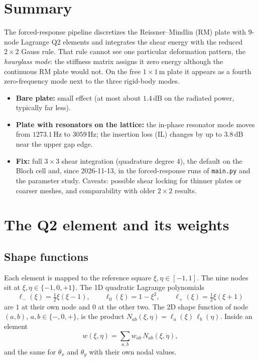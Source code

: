 \section{Summary}

The forced-response pipeline discretizes the Reissner--Mindlin (RM) plate with
9-node Lagrange Q2 elements and integrates the shear energy with the reduced
$2\times 2$ Gauss rule. That rule cannot see one particular deformation pattern,
the \emph{hourglass mode}: the stiffness matrix assigns it zero energy although the
continuous RM plate would not. On the free $1 \times 1\,\mathrm{m}$ plate it appears
as a fourth zero-frequency mode next to the three rigid-body modes.
\begin{itemize}
  \item \textbf{Bare plate:} small effect (at most about $1.4\,\mathrm{dB}$ on the
        radiated power, typically far less).
  \item \textbf{Plate with resonators on the lattice:} the in-phase resonator mode
        moves from $1273.1\,\mathrm{Hz}$ to $3059\,\mathrm{Hz}$; the insertion loss
        (IL) changes by up to $3.8\,\mathrm{dB}$ near the upper gap edge.
  \item \textbf{Fix:} full $3\times 3$ shear integration (quadrature degree 4),
        the default on the Bloch cell and, since 2026-11-13, in the forced-response
        runs of \texttt{main.py} and the parameter study. Caveats: possible shear
        locking for thinner plates or coarser meshes, and comparability with older
        $2\times 2$ results.
\end{itemize}

\section{The Q2 element and its weights}

\subsection{Shape functions}
Each element is mapped to the reference square $\xi, \eta \in [-1, 1]$. The nine
nodes sit at $\xi, \eta \in \{-1, 0, +1\}$. The 1D quadratic Lagrange polynomials
\begin{equation}
  \ell_-(\xi) = \tfrac12 \xi(\xi - 1), \qquad
  \ell_0(\xi) = 1 - \xi^2, \qquad
  \ell_+(\xi) = \tfrac12 \xi(\xi + 1)
\end{equation}
are $1$ at their own node and $0$ at the other two. The 2D shape function of node
$(a, b)$, $a, b \in \{-, 0, +\}$, is the product $N_{ab}(\xi, \eta) =
\ell_a(\xi)\,\ell_b(\eta)$. Inside an element
\begin{equation}
  w(\xi, \eta) = \sum_{a,b} w_{ab}\, N_{ab}(\xi, \eta),
\end{equation}
and the same for $\theta_x$ and $\theta_y$ with their own nodal values.

